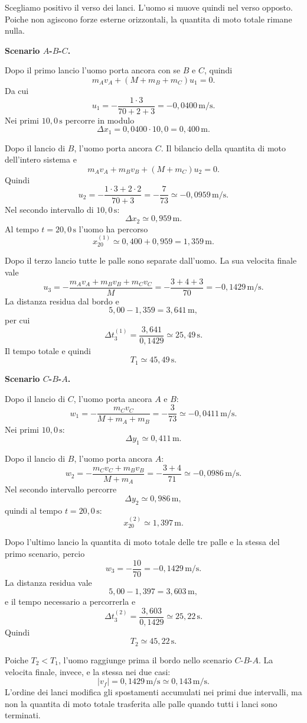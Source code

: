 \begin{soluzione}
Scegliamo positivo il verso dei lanci. L'uomo si muove quindi nel verso
opposto. Poiche non agiscono forze esterne orizzontali, la quantita di moto
totale rimane nulla.

\textbf{Scenario \(A\)-\(B\)-\(C\).}

Dopo il primo lancio l'uomo porta ancora con se \(B\) e \(C\), quindi
\[
m_Av_A+(M+m_B+m_C)u_1=0.
\]
Da cui
\[
u_1=-\frac{1\cdot3}{70+2+3}
=-0{,}0400\,\mathrm{m/s}.
\]
Nei primi \(10{,}0\,\mathrm{s}\) percorre in modulo
\[
\Delta x_1=0{,}0400\cdot10{,}0=0{,}400\,\mathrm{m}.
\]

Dopo il lancio di \(B\), l'uomo porta ancora \(C\). Il bilancio della quantita
di moto dell'intero sistema e
\[
m_Av_A+m_Bv_B+(M+m_C)u_2=0.
\]
Quindi
\[
u_2=-\frac{1\cdot3+2\cdot2}{70+3}
=-\frac{7}{73}
\simeq-0{,}0959\,\mathrm{m/s}.
\]
Nel secondo intervallo di \(10{,}0\,\mathrm{s}\):
\[
\Delta x_2\simeq0{,}959\,\mathrm{m}.
\]
Al tempo \(t=20{,}0\,\mathrm{s}\) l'uomo ha percorso
\[
x_{20}^{(1)}\simeq0{,}400+0{,}959=1{,}359\,\mathrm{m}.
\]

Dopo il terzo lancio tutte le palle sono separate dall'uomo. La sua velocita
finale vale
\[
u_3=-\frac{m_Av_A+m_Bv_B+m_Cv_C}{M}
=-\frac{3+4+3}{70}
=-0{,}1429\,\mathrm{m/s}.
\]
La distanza residua dal bordo e
\[
5{,}00-1{,}359=3{,}641\,\mathrm{m},
\]
per cui
\[
\Delta t_3^{(1)}=\frac{3{,}641}{0{,}1429}
\simeq25{,}49\,\mathrm{s}.
\]
Il tempo totale e quindi
\[
T_1\simeq45{,}49\,\mathrm{s}.
\]

\textbf{Scenario \(C\)-\(B\)-\(A\).}

Dopo il lancio di \(C\), l'uomo porta ancora \(A\) e \(B\):
\[
w_1=-\frac{m_Cv_C}{M+m_A+m_B}
=-\frac{3}{73}
\simeq-0{,}0411\,\mathrm{m/s}.
\]
Nei primi \(10{,}0\,\mathrm{s}\):
\[
\Delta y_1\simeq0{,}411\,\mathrm{m}.
\]

Dopo il lancio di \(B\), l'uomo porta ancora \(A\):
\[
w_2=-\frac{m_Cv_C+m_Bv_B}{M+m_A}
=-\frac{3+4}{71}
\simeq-0{,}0986\,\mathrm{m/s}.
\]
Nel secondo intervallo percorre
\[
\Delta y_2\simeq0{,}986\,\mathrm{m},
\]
quindi al tempo \(t=20{,}0\,\mathrm{s}\):
\[
x_{20}^{(2)}\simeq1{,}397\,\mathrm{m}.
\]

Dopo l'ultimo lancio la quantita di moto totale delle tre palle e la stessa del
primo scenario, percio
\[
w_3=-\frac{10}{70}
=-0{,}1429\,\mathrm{m/s}.
\]
La distanza residua vale
\[
5{,}00-1{,}397=3{,}603\,\mathrm{m},
\]
e il tempo necessario a percorrerla e
\[
\Delta t_3^{(2)}=\frac{3{,}603}{0{,}1429}
\simeq25{,}22\,\mathrm{s}.
\]
Quindi
\[
T_2\simeq45{,}22\,\mathrm{s}.
\]

Poiche \(T_2<T_1\), l'uomo raggiunge prima il bordo nello scenario
\(C\)-\(B\)-\(A\). La velocita finale, invece, e la stessa nei due casi:
\[
|v_f|=0{,}1429\,\mathrm{m/s}\simeq0{,}143\,\mathrm{m/s}.
\]
L'ordine dei lanci modifica gli spostamenti accumulati nei primi due intervalli,
ma non la quantita di moto totale trasferita alle palle quando tutti i lanci
sono terminati.
\end{soluzione}
